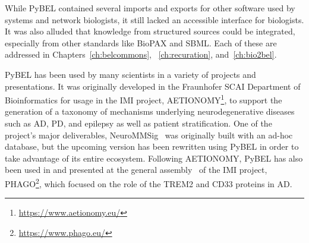 While PyBEL contained several imports and exports for other software used by systems and network biologists, it still lacked an accessible interface for biologists.
It was also alluded that knowledge from structured sources could be integrated, especially from other standards like \ac{BioPAX} and \ac{SBML}.
Each of these are addressed in Chapters~\ref{ch:belcommons}, ~\ref{ch:recuration}, and~\ref{ch:bio2bel}.

PyBEL has been used by many scientists in a variety of projects and presentations.
It was originally developed in the Fraunhofer SCAI Department of Bioinformatics for usage in the \ac{IMI} project, AETIONOMY\footnote{\url{https://www.aetionomy.eu/}}, to support the generation of a taxonomy of mechanisms underlying neurodegenerative diseases such as \ac{AD}, \ac{PD}, and epilepsy as well as patient stratification.
One of the project's major deliverables, NeuroMMSig~\cite{Domingo-Fernandez2017} was originally built with an ad-hoc database, but the upcoming version has been rewritten using PyBEL in order to take advantage of its entire ecosystem.
Following AETIONOMY, PyBEL has also been used in and presented at the general assembly~\cite{Ebeling2017} of the \ac{IMI} project, PHAGO\footnote{\url{https://www.phago.eu/}}, which focused on the role of the TREM2 and CD33 proteins in \ac{AD}.

